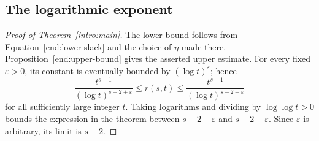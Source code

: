 \subsection{The logarithmic exponent}
\label{end:main-proof}

\begin{proof}[Proof of Theorem~\ref{intro:main}]
The lower bound follows from Equation~\eqref{end:lower-slack} and the
choice of $\eta$ made there. Proposition~\ref{end:upper-bound} gives
the asserted upper estimate. For every fixed $\varepsilon>0$, its
constant is eventually bounded by $(\log t)^\varepsilon$; hence
\[
 \frac{t^{s-1}}{(\log t)^{s-2+\varepsilon}}
 \le r(s,t)\le
 \frac{t^{s-1}}{(\log t)^{s-2-\varepsilon}}
\]
for all sufficiently large integer $t$. Taking logarithms and dividing
by $\log\log t>0$ bounds the expression in the theorem between
$s-2-\varepsilon$ and $s-2+\varepsilon$. Since $\varepsilon$ is
arbitrary, its limit is $s-2$.
\end{proof}
